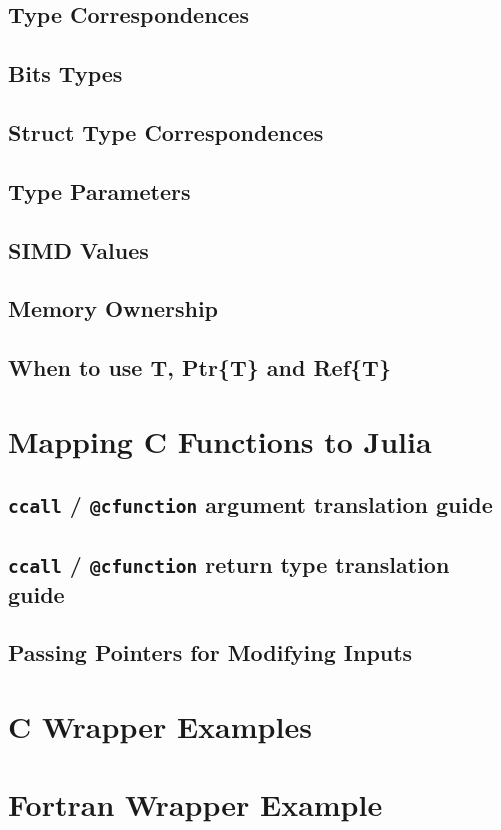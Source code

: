     \subsection{Type Correspondences}
    \subsection{Bits Types}
    \subsection{Struct Type Correspondences}
    \subsection{Type Parameters}
    \subsection{SIMD Values}
    \subsection{Memory Ownership}
    \subsection{When to use T, Ptr\{T\} and Ref\{T\}}
    \section{Mapping C Functions to Julia}
    \subsection{\texttt{ccall} / \texttt{@cfunction} argument translation guide}
    \subsection{\texttt{ccall} / \texttt{@cfunction} return type translation guide}
    \subsection{Passing Pointers for Modifying Inputs}
    \section{C Wrapper Examples}
    \section{Fortran Wrapper Example}
